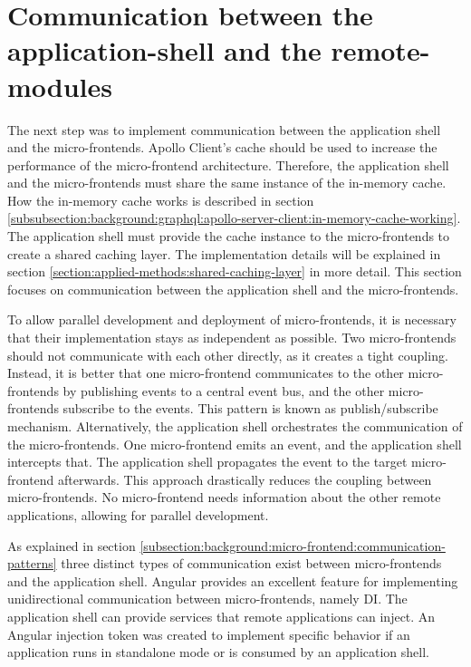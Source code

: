 \section{Communication between the application-shell and the remote-modules}\label{section:applied-methods:communication-shell-remote}

The next step was to implement communication between the application shell and the micro-frontends. Apollo Client's cache should be used to increase the performance of the micro-frontend architecture. Therefore, the application shell and the micro-frontends must share the same instance of the in-memory cache. How the in-memory cache works is described in section  \ref{subsubsection:background:graphql:apollo-server-client:in-memory-cache-working}. The application shell must provide the cache instance to the micro-frontends to create a shared caching layer. The implementation details will be explained in section \ref{section:applied-methods:shared-caching-layer} in more detail. This section focuses on communication between the application shell and the micro-frontends.

\bigskip

\noindent To allow parallel development and deployment of micro-frontends, it is necessary that their implementation stays as independent as possible. Two micro-frontends should not communicate with each other directly, as it creates a tight coupling. Instead, it is better that one micro-frontend communicates to the other micro-frontends by publishing events to a central event bus, and the other micro-frontends subscribe to the events. This pattern is known as publish/subscribe mechanism. Alternatively, the application shell orchestrates the communication of the micro-frontends. One micro-frontend emits an event, and the application shell intercepts that. The application shell propagates the event to the target micro-frontend afterwards. This approach drastically reduces the coupling between micro-frontends. No micro-frontend needs information about the other remote applications, allowing for parallel development.

\bigskip

\noindent As explained in section \ref{subsection:background:micro-frontend:communication-patterns} three distinct types of communication exist between micro-frontends and the application shell. Angular provides an excellent feature for implementing unidirectional communication between micro-frontends, namely \ac{DI}. The application shell can provide services that remote applications can inject. An Angular injection token was created to implement specific behavior if an application runs in standalone mode or is consumed by an application shell.

